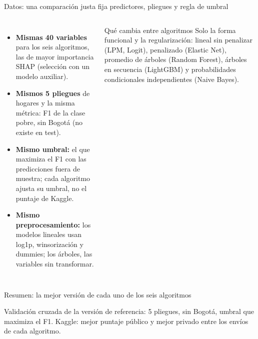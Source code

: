 \begin{frame}{Datos: una comparación justa fija predictores, pliegues y regla de umbral}
  \begin{columns}[T]
    \small
    \begin{itemize}\setlength{\itemsep}{4pt}
      \item \textbf{Mismas 40 variables} para los seis algoritmos, las de mayor importancia SHAP (selección con un modelo auxiliar).
      \item \textbf{Mismos 5 pliegues} de hogares y la misma métrica: F1 de la clase pobre, sin Bogotá (no existe en test).
      \item \textbf{Mismo umbral:} el que maximiza el F1 con las predicciones fuera de muestra; cada algoritmo ajusta su umbral, no el puntaje de Kaggle.
      \item \textbf{Mismo preprocesamiento:} los modelos lineales usan log1p, winsorización y dummies; los árboles, las variables sin transformar.
    \end{itemize}
    \begin{block}{Qué cambia entre algoritmos}
      \footnotesize
      Solo la forma funcional y la regularización: lineal sin penalizar (LPM, Logit), penalizado (Elastic Net), promedio de árboles (Random Forest), árboles en secuencia (LightGBM) y probabilidades condicionales independientes (Naive Bayes).
    \end{block}
    \vspace{1mm}
  \end{columns}
\end{frame}

\begin{frame}{Resumen: la mejor versión de cada uno de los seis algoritmos}
  \label{p:comp}
  \centering
  \small
  \resizebox{.97\linewidth}{!}{}\\[3mm]
  \footnotesize\raggedright
  Validación cruzada de la versión de referencia: 5 pliegues, sin Bogotá, umbral que maximiza el F1. Kaggle: mejor puntaje público y mejor privado entre los envíos de cada algoritmo.
\end{frame}

